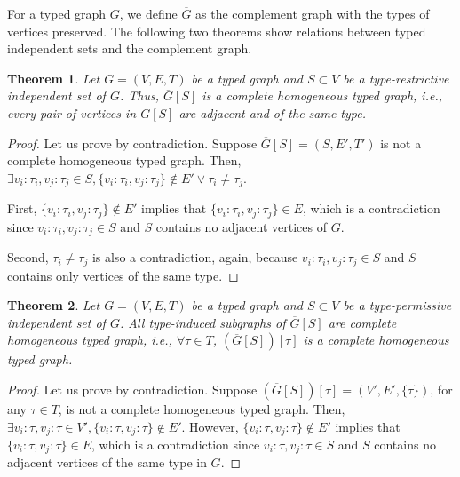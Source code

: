 \documentclass[preprint,12pt]{elsarticle}
\theoremstyle{plain}
\newtheorem{theorem}{Theorem}[section]
\newcommand\tyv[2]{#1\!\!:\!\!#2}
\begin{document}
For a typed graph $G$, we define $\overline{G}$ as the 
complement graph with the types of vertices preserved.
The following two theorems show relations between typed
independent sets and the complement graph.

\begin{theorem}
Let $G = (V,E,T)$ be a typed graph and $S\subset V$
be a type-restrictive independent set of $G$.
Thus, $\overline{G}[S]$ is a complete homogeneous
typed graph,
i.e.,
every pair of vertices in $\overline{G}[S]$
are adjacent and of the same type.
\end{theorem}
\begin{proof}
Let us prove by contradiction.
Suppose $\overline{G}[S] = (S,E',T')$
is not a complete homogeneous typed graph.
Then,
$\exists \tyv{v_i}{\tau_i},\tyv{v_j}{\tau_j}\in S,
 \{\tyv{v_i}{\tau_i},\tyv{v_j}{\tau_j}\}\notin E' \vee \tau_i\neq\tau_j$.

First,
$\{\tyv{v_i}{\tau_i},\tyv{v_j}{\tau_j}\}\notin E'$
implies that
$\{\tyv{v_i}{\tau_i},\tyv{v_j}{\tau_j}\}\in E$,
which is a contradiction
since 
$\tyv{v_i}{\tau_i},\tyv{v_j}{\tau_j}\in S$
and $S$ contains no adjacent vertices of $G$.

Second,
$\tau_i\neq\tau_j$
is also a contradiction,
again, because 
$\tyv{v_i}{\tau_i},\tyv{v_j}{\tau_j}\in S$
and $S$ contains only vertices of the same type.
\end{proof}


\begin{theorem}
Let $G = (V,E,T)$ be a typed graph and $S\subset V$
be a type-permissive independent set of $G$.
All
type-induced subgraphs of $\overline{G}[S]$ are
complete homogeneous typed graph,
i.e.,
$\forall \tau\in T$,
$(\overline{G}[S])[\tau]$
is a complete homogeneous typed graph.
\end{theorem}
\begin{proof}
Let us prove by contradiction.
Suppose 
$(\overline{G}[S])[\tau] = (V',E',\{\tau\})$,
for any $\tau\in T$,
is not a complete homogeneous typed graph.
Then,
$\exists \tyv{v_i}{\tau},\tyv{v_j}{\tau}\in V',
 \{\tyv{v_i}{\tau},\tyv{v_j}{\tau}\}\notin E'$.
However,
$\{\tyv{v_i}{\tau},\tyv{v_j}{\tau}\}\notin E'$
implies that
$\{\tyv{v_i}{\tau},\tyv{v_j}{\tau}\}\in E$,
which is a contradiction
since 
$\tyv{v_i}{\tau},\tyv{v_j}{\tau}\in S$
and $S$ contains no adjacent vertices of the same type in $G$.
\end{proof}
\end{document}
